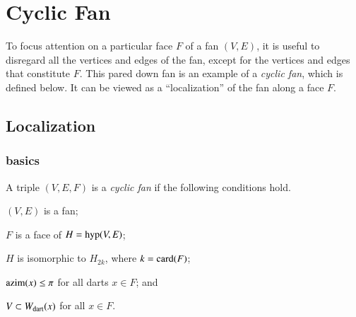 %

\chapter{Cyclic Fan}\label{sec:cyclic}


\begin{summary}
To focus attention on a particular face $F$ of a fan $(V,E)$, it is useful to disregard all the vertices
and edges of the fan, except for the vertices and edges that constitute $F$.  This pared down fan
is an example of a {\it cyclic fan}, which is defined below.  It can be viewed as a ``localization'' of
the fan along a face $F$.  
\end{summary}

\section{Localization}


\subsection{basics}


\begin{definition}  A triple $(V,E,F)$ is a {\it cyclic fan} if the following conditions hold.
\begin{nomerate} 
\item {} $(V,E)$ is a fan;
\item {} $F$ is a face of $H = {\operatorname{hyp}}(V,E)$;
\item {} $H$ is isomorphic to $H_{2k}$, where $k = {\operatorname{card}}(F)$;
\item {} ${\operatorname{azim}}(x)\le \pi$ for all darts $x\in F$; and
\item {} $V\subset W_{\text{dart}}(x)$ for all $x\in F$.
\end{nomerate}
\end{definition}
%

